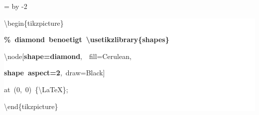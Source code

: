 \begingroup
\ttfamily
{}
=\textwidth
\advance{} by -2\fboxsep
\noindent
\colorbox{background}
{%
\parbox{\dimen255}
{%
\rule[-0.5ex]{0pt}{2.5ex}\hspace*{0.0em}\textbackslash{}begin\{tikzpicture\}\\
\rule[-0.5ex]{0pt}{2.5ex}\hspace*{1.0em}\textcolor{G}{\textbf{\%~diamond~benoetigt~\textbackslash{}usetikzlibrary\{shapes\}}}\\
\rule[-0.5ex]{0pt}{2.5ex}\hspace*{1.0em}\textbackslash{}node[\textcolor{R}{\textbf{shape=diamond}},~~fill=Cerulean,\\
\rule[-0.5ex]{0pt}{2.5ex}\hspace*{4.0em}\textcolor{R}{\textbf{shape~aspect=2}},~draw=Black]\\
\rule[-0.5ex]{0pt}{2.5ex}\hspace*{3.5em}at~(0,~0)~\{\textbackslash{}LaTeX\};\\
\rule[-0.5ex]{0pt}{2.5ex}\hspace*{0.0em}\textbackslash{}end\{tikzpicture\}}%
}%
\endgroup
